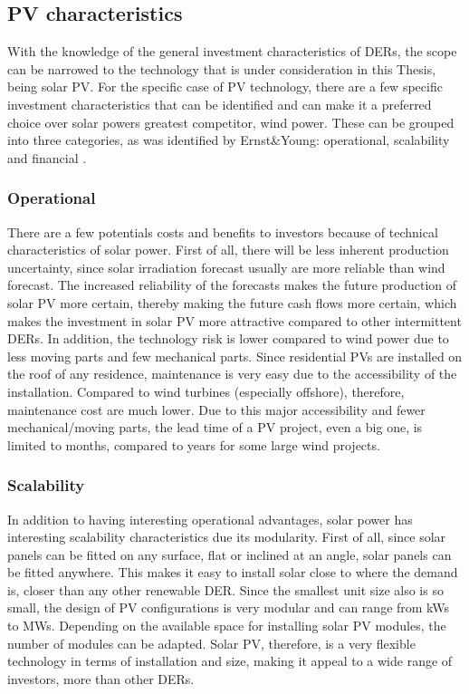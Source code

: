  \subsection{PV characteristics}
 \newline \newline \noindent 
 With the knowledge of the general investment characteristics of DERs, the scope can be narrowed to the technology that is under consideration in this Thesis, being solar PV. For the specific case of PV technology, there are a few specific investment characteristics that can be identified and can make it a preferred choice over solar powers greatest competitor, wind power. These can be grouped into three categories, as was identified by Ernst\&Young: operational, scalability and financial \cite{EY}.
 \subsubsection{Operational}
 There are a few potentials costs and benefits to investors because of technical characteristics of solar power. First of all, there will be less inherent production uncertainty, since solar irradiation forecast usually are more reliable than wind forecast. The increased reliability of the forecasts makes the future production of solar PV more certain, thereby making the future cash flows more certain, which makes the investment in solar PV more attractive compared to other intermittent DERs.
 \newline \newline \noindent
 In addition, the technology risk is lower compared to wind power due to less moving parts and few mechanical parts. Since residential PVs are installed on the roof of any residence, maintenance is very easy due to the accessibility of the installation. Compared to wind turbines (especially offshore), therefore, maintenance cost are much lower. Due to this major accessibility and fewer mechanical/moving parts, the lead time of a PV project, even a big one, is limited to months, compared to years for some large wind projects. 
 \subsubsection{Scalability}
 In addition to having interesting operational advantages, solar power has interesting scalability characteristics due its modularity. First of all, since solar panels can be fitted on any surface, flat or inclined at an angle, solar panels can be fitted anywhere. This makes it easy to install solar close to where the demand is, closer than any other renewable DER. Since the smallest unit size also is so small, the design of PV configurations is very modular and can range from kWs to MWs. Depending on the available space for installing solar PV modules, the number of modules can be adapted. Solar PV, therefore, is a very flexible technology in terms of installation and size, making it appeal to a wide range of investors, more than other DERs. 
